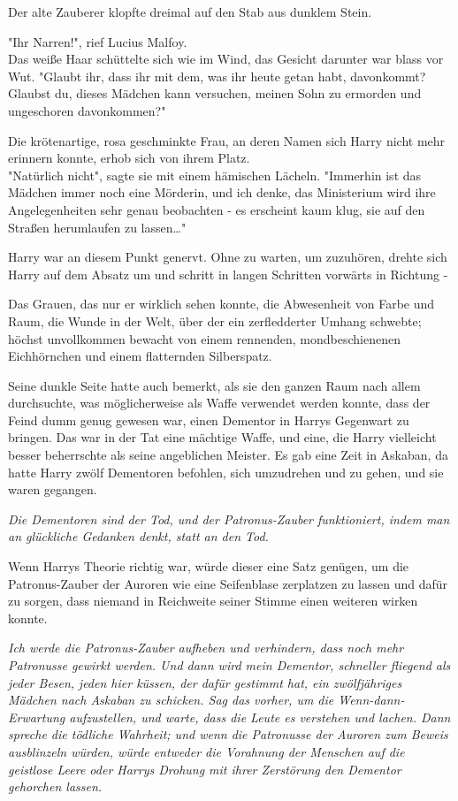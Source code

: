 {Der alte Zauberer klopfte dreimal auf den Stab aus dunklem Stein.

"Ihr Narren!", rief Lucius Malfoy.\\ Das weiße Haar schüttelte sich wie im Wind, das Gesicht darunter war blass vor Wut. "Glaubt ihr, dass ihr mit dem, was ihr heute getan habt, davonkommt? Glaubst du, dieses Mädchen kann versuchen, meinen Sohn zu ermorden und ungeschoren davonkommen?"

Die krötenartige, rosa geschminkte Frau, an deren Namen sich Harry nicht mehr erinnern konnte, erhob sich von ihrem Platz.\\ "Natürlich nicht", sagte sie mit einem hämischen Lächeln. "Immerhin ist das Mädchen immer noch eine Mörderin, und ich denke, das Ministerium wird ihre Angelegenheiten sehr genau beobachten - es erscheint kaum klug, sie auf den Straßen herumlaufen zu lassen…"

Harry war an diesem Punkt genervt. Ohne zu warten, um zuzuhören, drehte sich Harry auf dem Absatz um und schritt in langen Schritten vorwärts in Richtung -

Das Grauen, das nur er wirklich sehen konnte, die Abwesenheit von Farbe und Raum, die Wunde in der Welt, über der ein zerfledderter Umhang schwebte; höchst unvollkommen bewacht von einem rennenden, mondbeschienenen Eichhörnchen und einem flatternden Silberspatz.

Seine dunkle Seite hatte auch bemerkt, als sie den ganzen Raum nach allem durchsuchte, was möglicherweise als Waffe verwendet werden konnte, dass der Feind dumm genug gewesen war, einen Dementor in Harrys Gegenwart zu bringen. Das war in der Tat eine mächtige Waffe, und eine, die Harry vielleicht besser beherrschte als seine angeblichen Meister. Es gab eine Zeit in Askaban, da hatte Harry zwölf Dementoren befohlen, sich umzudrehen und zu gehen, und sie waren gegangen.

\emph{Die Dementoren sind der Tod, und der Patronus-Zauber funktioniert, indem man an glückliche Gedanken denkt, statt an den Tod.}

Wenn Harrys Theorie richtig war, würde dieser eine Satz genügen, um die Patronus-Zauber der Auroren wie eine Seifenblase zerplatzen zu lassen und dafür zu sorgen, dass niemand in Reichweite seiner Stimme einen weiteren wirken konnte.

\emph{Ich werde die Patronus-Zauber aufheben und verhindern, dass noch mehr Patronusse gewirkt werden. Und dann wird mein Dementor, schneller fliegend als jeder Besen,} \emph{jeden hier küssen, der dafür gestimmt hat, ein zwölfjähriges Mädchen nach Askaban zu schicken. Sag das vorher, um die Wenn-dann-Erwartung aufzustellen, und warte, dass die Leute es verstehen und lachen. Dann spreche die tödliche Wahrheit; und wenn die Patronusse der Auroren zum Beweis ausblinzeln würden, würde entweder die Vorahnung der Menschen auf die geistlose Leere oder Harrys Drohung mit ihrer Zerstörung den Dementor gehorchen lassen.}

}
